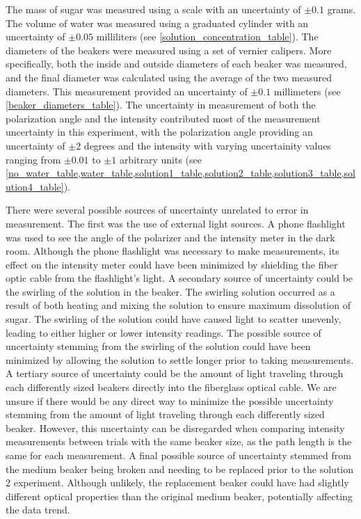 The mass of sugar was measured using a scale with an uncertainty of $\pm 0.1$ grams. The volume of water was measured using a graduated cylinder with an uncertainty of $\pm 0.05$ milliliters (see \cref{solution_concentration_table}). The diameters of the beakers were measured using a set of vernier calipers. More specifically, both the inside and outside diameters of each beaker was measured, and the final diameter was calculated using the average of the two measured diameters. This measurement provided an uncertainty of $\pm 0.1$ millimeters (see \cref{beaker_diameters_table}). The uncertainty in measurement of both the polarization angle and the intensity contributed most of the measurement uncertainty in this experiment, with the polarization angle providing an uncertainty of $\pm 2$ degrees and the intensity with varying uncertainity values ranging from $\pm 0.01$ to $\pm 1$ arbitrary units (see \cref{no_water_table,water_table,solution1_table,solution2_table,solution3_table,solution4_table}).

There were several possible sources of uncertainty unrelated to error in measurement. The first was the use of external light sources. A phone flashlight was used to see the angle of the polarizer and the intensity meter in the dark room. Although the phone flashlight was necessary to make measurements, its effect on the intensity meter could have been minimized by shielding the fiber optic cable from the flashlight's light.
A secondary source of uncertainty could be the swirling of the solution in the beaker. The swirling solution occurred as a result of both heating and mixing the solution to ensure maximum dissolution of sugar. The swirling of the solution could have caused light to scatter unevenly, leading to either higher or lower intensity readings. The possible source of uncertainty stemming from the swirling of the solution could have been minimized by allowing the solution to settle longer prior to taking measurements.
A tertiary source of uncertainty could be the amount of light traveling through each differently sized beakers directly into the fiberglass optical cable. We are unsure if there would be any direct way to minimize the possible uncertainty stemming from the amount of light traveling through each differently sized beaker. However, this uncertainty can be disregarded when comparing intensity measurements between trials with the same beaker size, as the path length is the same for each measurement. A final possible source of uncertainty stemmed from the medium beaker being broken and needing to be replaced prior to the solution 2 experiment. Although unlikely, the replacement beaker could have had slightly different optical properties than the original medium beaker, potentially affecting the data trend.